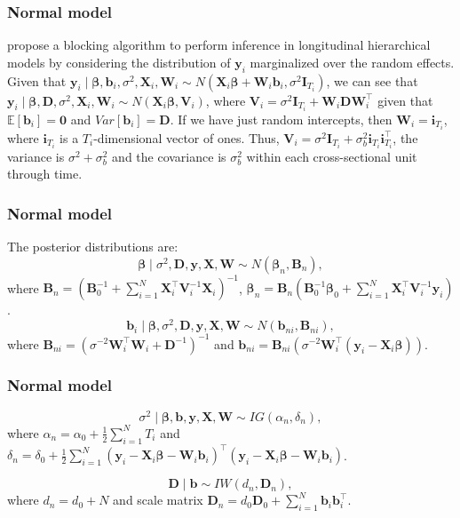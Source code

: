 \documentclass[12pt, compress]{beamer}
\begin{document}
\begin{frame}
	\frametitle{Normal model}
\cite{Chib1999} propose a blocking algorithm to perform inference in longitudinal hierarchical models by considering the distribution of $\bm{y}_i$ marginalized over the random effects. Given that $\bm{y}_i\mid  \bm{\beta},\bm{b}_i,\sigma^2,\bm{X}_i,\bm{W}_i\sim N(\bm{X}_i\bm{\beta}+\bm{W}_i\bm{b}_i,\sigma^2\bm{I}_{T_i})$, we can see that    $\bm{y}_i\mid \bm{\beta},\bm{D},\sigma^2,\bm{X}_i,\bm{W}_i\sim{N}(\bm{X}_i\bm{\beta},\bm{V}_i)$, where $\bm{V}_i=\sigma^2\bm{I}_{T_i}+\bm{W}_i\bm{D}\bm{W}_i^{\top}$ given that $\mathbb{E}[\bm{b}_i]=\bm{0}$ and $Var[\bm{b}_i]=\bm{D}$. If we have just random intercepts, then $\bm{W}_i=\bm{i}_{T_i}$, where $\bm{i}_{T_i}$ is a $T_i$-dimensional vector of ones. Thus, $\bm{V}_i=\sigma^2\bm{I}_{T_i}+\sigma_{b}^2\bm{i}_{T_i}\bm{i}_{T_i}^{\top}$, the variance is $\sigma^2+\sigma^2_{b}$ and the covariance is $\sigma^2_{b}$ within each cross-sectional unit through time.
\end{frame}

\begin{frame}
	\frametitle{Normal model}
The posterior distributions are:
\begin{equation*}
	\bm{\beta}\mid \sigma^2,\bm{D},\bm{y}, \bm{X}, \bm{W} \sim {N}(\bm{\beta}_n,\bm{B}_n), 
\end{equation*}
where $\bm{B}_n = (\bm{B}_0^{-1} +\sum_{i=1}^N \bm{X}_i^{\top}\bm{V}_i^{-1}\bm{X}_i)^{-1}$, $\bm{\beta}_n= \bm{B}_n(\bm{B}_0^{-1}\bm{\beta}_0 + \sum_{i=1}^N\bm{X}_i^{\top}\bm{V}_i^{-1}\bm{y}_i)$.
\begin{equation*}
	\bm{b}_i\mid \bm{\beta},\sigma^2,\bm{D},\bm{y}, \bm{X}, \bm{W} \sim {N}(\bm{b}_{ni},\bm{B}_{ni}), 
\end{equation*} 
where $\bm{B}_{ni}=(\sigma^{-2}\bm{W}_i^{\top}\bm{W}_i+\bm{D}^{-1})^{-1}$ and $\bm{b}_{ni}=\bm{B}_{ni}(\sigma^{-2}\bm{W}_i^{\top}(\bm{y}_i-\bm{X}_i\bm{\beta}))$.
\end{frame}

\begin{frame}
	\frametitle{Normal model}
\begin{equation*}
	\sigma^2\mid  \bm{\beta}, \bm{b}, \bm{y}, \bm{X}, \bm{W} \sim {I}{G}(\alpha_n, \delta_n),
\end{equation*}
where $\alpha_n=\alpha_0+\frac{1}{2}\sum_{i=1}^N T_i$ and $\delta_n=\delta_0+\frac{1}{2}\sum_{i=1}^N(\bm{y}_i-\bm{X}_i\bm{\beta}-\bm{W}_i\bm{b}_i)^{\top}(\bm{y}_i-\bm{X}_i\bm{\beta}-\bm{W}_i\bm{b}_i)$.

\begin{equation*}
	\bm{D}\mid  \bm{b} \sim {I}{W}(d_n, \bm{D}_n),
\end{equation*}
where $d_n=d_0+N$ and scale matrix $\bm{D}_n=d_0\bm{D}_0+\sum_{i=1}^N\bm{b}_i\bm{b}_i^{\top}$.

\end{frame}
\end{document}
